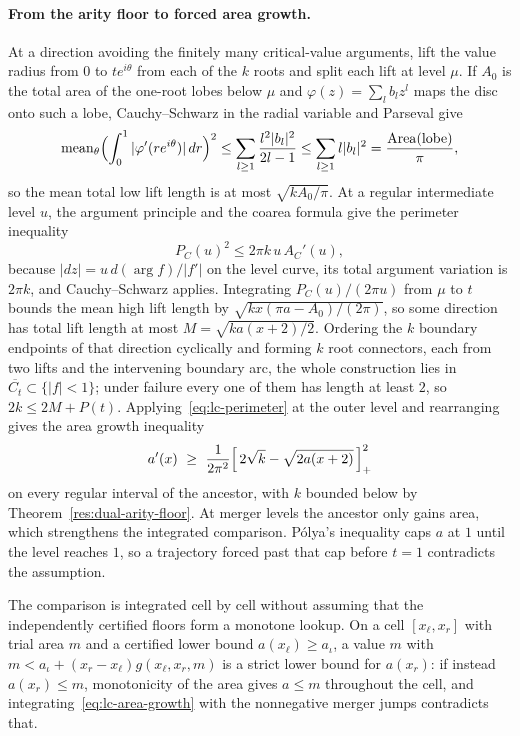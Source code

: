 \paragraph{From the arity floor to forced area growth.}
At a direction avoiding the finitely many critical-value arguments, lift the
value radius from $0$ to $te^{i\theta}$ from each of the $k$ roots and split
each lift at level $\mu$.  If $A_0$ is the total area of the one-root lobes
below $\mu$ and $\varphi(z)=\sum_l b_lz^l$ maps the disc onto such a lobe,
Cauchy--Schwarz in the radial variable and Parseval give
\[
 \operatorname{mean}_\theta
   \Bigl(\int_0^1|\varphi'(re^{i\theta})|\,dr\Bigr)^2
 \le\sum_{l\ge1}\frac{l^2|b_l|^2}{2l-1}
 \le\sum_{l\ge1}l|b_l|^2
 =\frac{\operatorname{Area}(\text{lobe})}\pi,
\]
so the mean total low lift length is at most $\sqrt{kA_0/\pi}$.  At a regular
intermediate level $u$, the argument principle and the coarea formula give the
perimeter inequality
\begin{equation}\label{eq:lc-perimeter}
 P_C(u)^2\le2\pi k\,u\,A_C'(u),
\end{equation}
because $|dz|=u\,d(\arg f)/|f'|$ on the level curve, its total argument
variation is $2\pi k$, and Cauchy--Schwarz applies.  Integrating
$P_C(u)/(2\pi u)$ from $\mu$ to $t$ bounds the mean high lift length by
$\sqrt{kx(\pi a-A_0)/(2\pi)}$, so some direction has total lift length at most
$M=\sqrt{ka(x+2)/2}$.  Ordering the $k$ boundary endpoints of that direction
cyclically and forming $k$ root connectors, each from two lifts and the
intervening boundary arc, the whole construction lies in
$\overline{C_t}\subset\{|f|<1\}$; under failure every one of them has length
at least $2$, so $2k\le2M+P(t)$.  Applying~\eqref{eq:lc-perimeter} at the
outer level and rearranging gives the area growth inequality
\begin{equation}\label{eq:lc-area-growth}
 a'(x)\ \ge\ \frac1{2\pi^2}
 \Bigl[\,2\sqrt k-\sqrt{2a(x+2)}\,\Bigr]_{+}^{2}
\end{equation}
on every regular interval of the ancestor, with $k$ bounded below by
Theorem~\ref{res:dual-arity-floor}.  At merger levels the ancestor only gains
area, which strengthens the integrated comparison.  P\'olya's inequality caps
$a$ at $1$ until the level reaches $1$, so a trajectory forced past that cap
before $t=1$ contradicts the assumption.

The comparison is integrated cell by cell without assuming that the
independently certified floors form a monotone lookup.  On a cell
$[x_\ell,x_r]$ with trial area $m$ and a certified lower bound $a(x_\ell)\ge
a_\iota$, a value $m$ with $m<a_\iota+(x_r-x_\ell)g(x_\ell,x_r,m)$ is a strict
lower bound for $a(x_r)$: if instead $a(x_r)\le m$, monotonicity of the area
gives $a\le m$ throughout the cell, and integrating~\eqref{eq:lc-area-growth}
with the nonnegative merger jumps contradicts that.

